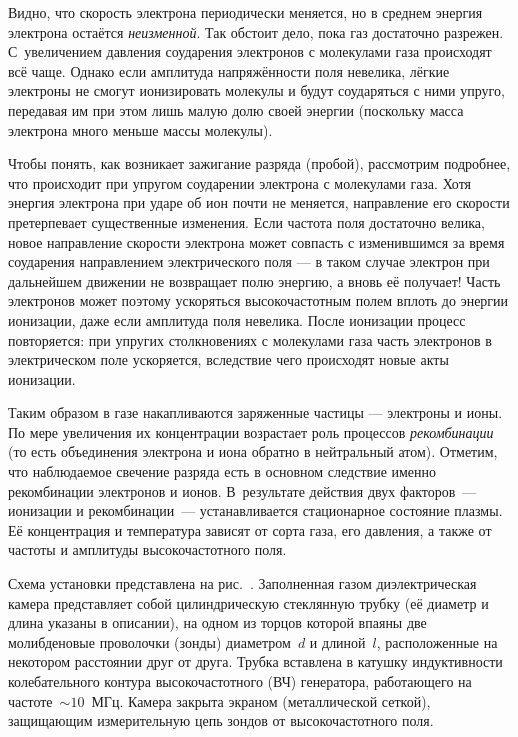 Видно, что скорость электрона периодически меняется, 
но в среднем энергия электрона остаётся \emph{неизменной}. 
Так обстоит дело, пока газ достаточно разрежен. С~увеличением
давления соударения электронов с молекулами газа происходят всё чаще.
Однако если амплитуда напряжённости поля невелика,
лёгкие электроны не смогут ионизировать молекулы 
и будут соударяться с ними упруго, передавая им при этом
лишь малую долю своей энергии (поскольку масса электрона
много меньше массы молекулы).

Чтобы понять, как возникает зажигание разряда (пробой), рассмотрим
подробнее, что происходит при упругом соударении электрона с молекулами газа. 
Хотя энергия электрона при ударе об ион почти не меняется, 
направление его скорости претерпевает существенные изменения.
Если частота поля достаточно велика, новое направление
скорости электрона может совпасть с изменившимся за время соударения направлением 
электрического поля --- в таком случае электрон при
дальнейшем движении не возвращает полю энергию, а вновь её получает! 
Часть
электронов может поэтому ускоряться высокочастотным полем вплоть
до энергии ионизации, даже если амплитуда поля невелика. 
После ионизации процесс повторяется: при упругих столкновениях с молекулами газа 
часть электронов в электрическом поле ускоряется, вследствие чего 
происходят новые акты ионизации. 

Таким образом в газе накапливаются заряженные частицы --- электроны и ионы. По мере
увеличения их концентрации возрастает роль процессов \emph{рекомбинации}
(то есть объединения электрона и иона обратно в нейтральный атом). 
Отметим, что наблюдаемое свечение разряда есть в основном следствие именно рекомбинации
электронов и ионов.
В~результате
действия двух факторов~--- ионизации и рекомбинации~---
устанавливается стационарное состояние плазмы.
Её концентрация и температура зависят от сорта газа, его давления,
а также от частоты и амплитуды высокочастотного поля.


\experiment

Схема установки представлена на рис.~.
Заполненная газом диэлектрическая камера представляет собой цилиндрическую
стеклянную трубку (её диаметр и длина указаны в описании), на одном из торцов
которой впаяны две молибденовые проволочки (зонды)
диаметром~$d$ и длиной~$l$, расположенные на некотором расстоянии друг от друга.
Трубка вставлена в катушку индуктивности колебательного контура высокочастотного 
(ВЧ) генератора, 
работающего на частоте~$\sim10$~МГц. 
Камера закрыта экраном (металлической сеткой), защищающим измерительную
цепь зондов от высокочастотного поля.

